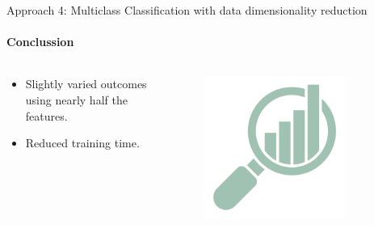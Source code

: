\documentclass[9pt, pstricks, xcolor=dvipsnames]{beamer}
\begin{document}
\begin{frame}{Approach 4: Multiclass Classification with data dimensionality reduction}
\framesubtitle{Conclussion}
\begin{columns}
    \begin{column}{0.5\textwidth}
	\begin{itemize}
	    \item Slightly varied outcomes using nearly half the features.
	    \item Reduced training time.
	\end{itemize}
    \end{column}
    \begin{column}{0.5\textwidth}
        \begin{figure}
            \centering
            \includegraphics[width=0.8\textwidth]{images/analytics.png}
        \end{figure}
    \end{column}

\end{columns}
\end{frame}
\end{document}
